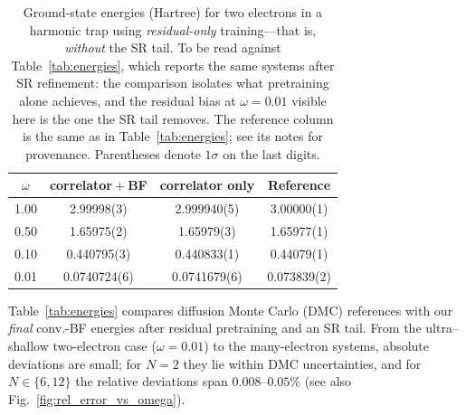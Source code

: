 \begin{table}[h!]
\centering
\caption[Two-electron energies from residual-only training]{Ground-state energies (Hartree) for two electrons in a harmonic trap using
\emph{residual-only} training---that is, \emph{without} the SR tail. To be read against
Table~\ref{tab:energies}, which reports the same systems after SR refinement: the
comparison isolates what pretraining alone achieves, and the residual bias at
$\omega=0.01$ visible here is the one the SR tail removes. The reference column is the same
as in Table~\ref{tab:energies}; see its notes for provenance. Parentheses denote $1\sigma$ on the last digits.}
\label{tab:Residual}
\begin{tabular}{c c c c}
\hline
$\omega$ & correlator${}+{}$BF & correlator only & Reference \\
\hline
1.00  & 2.99998(3)   & 2.999940(5)  & 3.00000(1) \\
0.50  & 1.65975(2)   & 1.65979(3)   & 1.65977(1) \\
0.10  & 0.440795(3)  & 0.440833(1)  & 0.44079(1) \\
0.01  & 0.0740724(6) & 0.0741679(6) & 0.073839(2) \\
\hline
\end{tabular}
\end{table}

Table~\ref{tab:energies} compares diffusion Monte Carlo (DMC) references with
our \emph{final} conv.-BF energies after residual pretraining and an SR tail.
From the ultra–shallow two-electron case ($\omega{=}0.01$) to the many-electron
systems, absolute deviations are small; for $N{=}2$ they lie within DMC
uncertainties, and for $N\!\in\!\{6,12\}$ the relative deviations span
$0.008$–$0.05\%$ (see also
Fig.~\ref{fig:rel_error_vs_omega}).

